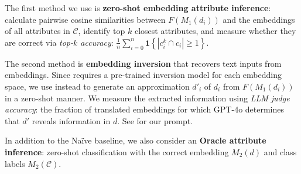 The first method we use is \textbf{zero-shot embedding attribute inference}: calculate pairwise cosine similarities between $F(M_1(d_i))$ and the embeddings of all attributes in $\mathcal{C}$, identify top $k$ closest attributes, and measure whether they are correct via \textit{top-$k$ accuracy}: $\frac{1}{n}\sum_{i=0}^{n}\mathbf{1}\left\{|c^k_i\cap c_i| \geq 1\right\}$.

The second method is \textbf{embedding inversion} that recovers text inputs from embeddings.  Since \cite{morris2023textembeddingsrevealalmost} requires a pre-trained inversion model for each embedding space, we use \cite{zhang2025universalzeroshotembeddinginversion} instead to generate an approximation $d'_i$ of $d_i$ from $F(M_1(d_i))$ in a zero-shot manner.  We measure the extracted information using \textit{LLM judge accuracy}: the fraction of translated embeddings for which GPT-4o determines that $d'$ reveals information in $d$. See  for our prompt. 

In addition to the Naïve baseline, we also consider an \textbf{Oracle attribute inference}: zero-shot classification with the correct embedding $M_2(d)$ and class labels $M_2(\mathcal{C})$.
 